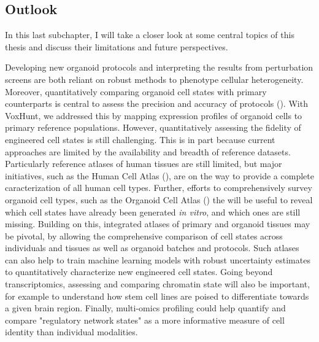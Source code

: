 \subsection{Outlook}

In this last subchapter, I will take a closer look at some central topics of this thesis and discuss their limitations and future perspectives.

Developing new organoid protocols and interpreting the results from perturbation screens are both reliant on robust methods to phenotype cellular heterogeneity. Moreover, quantitatively comparing organoid cell states with primary counterparts is central to assess the precision and accuracy of protocols (\cite{camp_single-cell_2018}). With VoxHunt, we addressed this by mapping expression profiles of organoid cells to primary reference populations. However, quantitatively assessing the fidelity of engineered cell states is still challenging. This is in part because current approaches are limited by the availability and breadth of reference datasets. Particularly reference atlases of human tissues are still limited, but major initiatives, such as the Human Cell Atlas (\cite{regev_human_2017}), are on the way to provide a complete caracterization of all human cell types. Further, efforts to comprehensively survey organoid cell types, such as the Organoid Cell Atlas (\cite{the_human_cell_atlas_biological_network_organoids_organoid_2021}) the will be useful to reveal which cell states have already been generated \textit{in vitro}, and which ones are still missing. Building on this, integrated atlases of primary and organoid tissues may be pivotal, by allowing the comprehensive comparison of cell states across individuals and tissues as well as organoid batches and protocols. Such atlases can also help to train machine learning models with robust uncertainty estimates to quantitatively characterize new engineered cell states. Going beyond transcriptomics, assessing and comparing chromatin state will also be important, for example to understand how stem cell lines are poised to differentiate towards a given brain region. Finally, multi-omics profiling could help quantify and compare "regulatory network states" as a more informative measure of cell identity than individual modalities.


